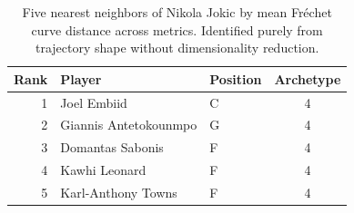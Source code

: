 \begin{table}[htbp]
  \centering\small
  \begin{tabular}{rllc}
    \toprule
    Rank & Player & Position & Archetype \\
    \midrule
    1 & Joel Embiid & C & 4 \\
    2 & Giannis Antetokounmpo & G & 4 \\
    3 & Domantas Sabonis & F & 4 \\
    4 & Kawhi Leonard & F & 4 \\
    5 & Karl-Anthony Towns & F & 4 \\
    \bottomrule
  \end{tabular}
  \caption{Five nearest neighbors of Nikola Jokic by mean Fr\'{e}chet curve distance across metrics. Identified purely from trajectory shape without dimensionality reduction.}
  \label{tab:Nikola_Jokic_frechet_curve_neighbors}
\end{table}

